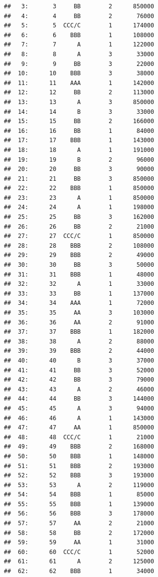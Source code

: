 \documentclass[
  11pt,
]{article}
\begin{document}
\begin{verbatim}
##   3:       3     BB        2      850000
##   4:       4     BB        2       76000
##   5:       5  CCC/C        1      174000
##   6:       6    BBB        1      108000
##   7:       7      A        1      122000
##   8:       8      A        3       33000
##   9:       9     BB        3       22000
##  10:      10    BBB        3       38000
##  11:      11    AAA        1      142000
##  12:      12     BB        2      113000
##  13:      13      A        3      850000
##  14:      14      B        3       33000
##  15:      15     BB        2      166000
##  16:      16     BB        1       84000
##  17:      17    BBB        1      143000
##  18:      18      A        1      191000
##  19:      19      B        2       96000
##  20:      20     BB        3       90000
##  21:      21     BB        3      850000
##  22:      22    BBB        1      850000
##  23:      23      A        1      850000
##  24:      24      A        1      198000
##  25:      25     BB        3      162000
##  26:      26     BB        2       21000
##  27:      27  CCC/C        1      850000
##  28:      28    BBB        2      108000
##  29:      29    BBB        2       49000
##  30:      30     BB        3       50000
##  31:      31    BBB        1       48000
##  32:      32      A        1       33000
##  33:      33     BB        1      137000
##  34:      34    AAA        1       72000
##  35:      35     AA        3      103000
##  36:      36     AA        2       91000
##  37:      37    BBB        1      182000
##  38:      38      A        2       88000
##  39:      39    BBB        2       44000
##  40:      40      B        3       37000
##  41:      41     BB        3       52000
##  42:      42     BB        3       79000
##  43:      43      A        2       46000
##  44:      44     BB        3      144000
##  45:      45      A        3       94000
##  46:      46      A        1      143000
##  47:      47     AA        1      850000
##  48:      48  CCC/C        1       21000
##  49:      49    BBB        2      168000
##  50:      50    BBB        1      148000
##  51:      51    BBB        2      193000
##  52:      52    BBB        3      193000
##  53:      53      A        2      119000
##  54:      54    BBB        1       85000
##  55:      55    BBB        1      139000
##  56:      56    BBB        3      178000
##  57:      57     AA        2       21000
##  58:      58     BB        2      172000
##  59:      59     AA        1       31000
##  60:      60  CCC/C        1       52000
##  61:      61      A        2      125000
##  62:      62    BBB        1       34000

\end{verbatim}
\end{document}
